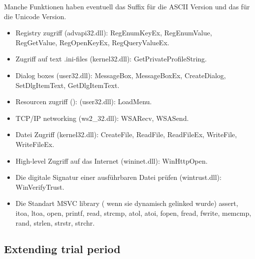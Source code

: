 
Manche Funktionen haben eventuell das  Suffix für die ASCII Version und das  für die Unicode Version.

\begin{itemize}

\item
Registry zugriff (advapi32.dll): 
RegEnumKeyEx, RegEnumValue, RegGetValue, RegOpenKeyEx, RegQueryValueEx.

\item
Zugriff auf text .ini-files (kernel32.dll): 
GetPrivateProfileString.

\item
Dialog boxes (user32.dll): 
MessageBox, MessageBoxEx, CreateDialog, SetDlgItemText, GetDlgItemText.

\item
Resourcen zugriff (): (user32.dll): LoadMenu.

\item
TCP/IP networking (ws2\_32.dll):
WSARecv, WSASend.

\item
Datei Zugriff (kernel32.dll):
CreateFile, ReadFile, ReadFileEx, WriteFile, WriteFileEx.

\item
High-level Zugriff auf das Internet (wininet.dll): WinHttpOpen.

\item
Die digitale Signatur einer ausführbaren Datei prüfen (wintrust.dll):
WinVerifyTrust.

\item
Die Standart MSVC library ( wenn sie dynamisch gelinked wurde) 
assert, itoa, ltoa, open, printf, read, strcmp, atol, atoi, fopen, fread, fwrite, memcmp, rand,
strlen, strstr, strchr.

\end{itemize}

\subsection{Extending trial period}

